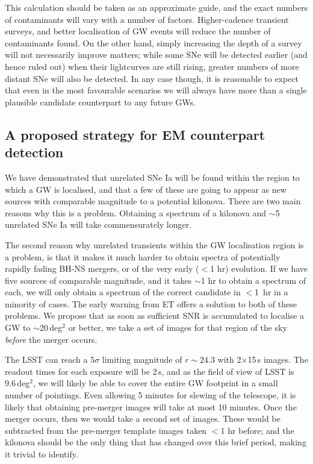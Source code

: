 \documentclass{aa}
\begin{document}
This calculation should be taken as an approximate guide, and the exact numbers of contaminants will vary with a number of factors. Higher-cadence transient surveys, and better localisation of GW events will reduce the number of contaminants found. On the other hand, simply increasing the depth of a survey will not necessarily improve matters; while some SNe will be detected earlier (and hence ruled out) when their lightcurves are still rising, greater numbers of more distant SNe will also be detected. In any case though, it is reasonable to expect that even in the most favourable scenarios we will always have more than a single plausible candidate counterpart to any future GWs.

\subsection{A proposed strategy for EM counterpart detection}

We have demonstrated that unrelated SNe Ia will be found within the region to which a GW is localised, and that a few of these are going to appear as new sources with comparable magnitude to a potential kilonova. There are two main reasons why this is a problem. Obtaining a spectrum of a kilonova and $\sim$5 unrelated SNe Ia will take commensurately longer.

The second reason why unrelated transients within the GW localisation region  is a problem, is that it makes it much harder to obtain spectra of potentially rapidly fading BH-NS mergers, or of the very early ($<$1 hr) evolution. If we have five sources of comparable magnitude, and it takes $\sim$1 hr to obtain a spectrum of each, we will only obtain a spectrum of the correct candidate in $<$1~hr in a minority of cases.
The early warning from ET offers a solution to both of these problems. We propose that as soon as sufficient SNR is accumulated to localise a GW to $\sim$20\,deg$^2$ or better, we take a set of images for that region of the sky {\it before} the merger occurs.

The LSST can reach a 5$\sigma$ limiting magnitude of $r\sim24.3$ with 2$\times$15\,s images. The readout times for each exposure will be 2\,s, and as the field of view of LSST is 9.6\,deg$^2$, we will likely be able to cover the entire GW footprint in a small number of pointings. Even allowing 5 minutes for slewing of the telescope, it is likely that obtaining pre-merger images will take at most 10 minutes.
Once the merger occurs, then we would take a second set of images. These would be subtracted from the pre-merger template images taken $<$1 hr before; and the kilonova should be the only thing that has changed over this brief period, making it trivial to identify.
\end{document}
